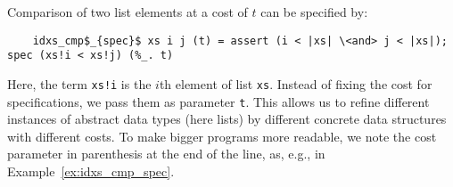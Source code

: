 \documentclass[acmsmall]{acmart}
\newcommand{\is}{\lstinline[language=isabelle]}
\begin{document}
\begin{comment}

A classical Hoare triple, i.e., the statement that a program $m$ satisfies a specification, can be written as:


An Hoare triple for a program \is$m$ can be expressed by \is{m <= assert P; spec Q t}.

A \emph{specification} of the form 
  assert P; spec Q t
  
describes a computation that, assuming precondition P, 
returns a result satisfying Q, using time t
  




A Hoare triple for program \is$m$, with precondition \is{P}, postcondition \is{Q} and resource usage \is{t} is written as a refinement condition:
\begin{lstlisting}
    m <= assert P; spec Q ($\lambda$_. t)
\end{lstlisting}
Here, \emph{assertions} are used to express preconditions of a program. They fail if their condition is not met, and return \emph{unit} otherwise:
\begin{lstlisting}
    assert P = if P then return () else fail
\end{lstlisting}

The right side of such a refinement condition stemming from a Hoare triple usually consist of a specification and a precondition...

m <= assert P; spec Q (...)

<-->

P ==>     m <= spec Q (...)

\end{comment}

\begin{example} \label{ex:compare}
Comparison of two list elements at a cost of $t$ can be specified by:
\begin{lstlisting}
    idxs_cmp$_{spec}$ xs i j (t) = assert (i < |xs| \<and> j < |xs|); spec (xs!i < xs!j) (%_. t)
\end{lstlisting}
Here, the term \is{xs!i} is the $i$th element of list \is$xs$.
Instead of fixing the cost for specifications, we pass them as parameter \is{t}. 
This allows us to refine different instances of abstract data types (here lists) by different concrete data structures with different costs.
To make bigger programs more readable, we note the cost parameter in parenthesis at the end of the line, as, e.g., in Example~\ref{ex:idxs_cmp_spec}.
%
\end{example}
%
\end{document}
